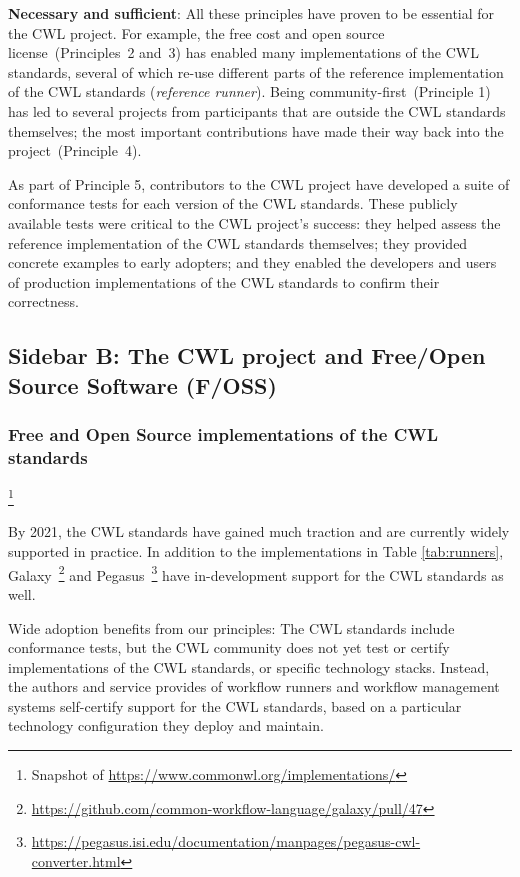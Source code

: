 {\textbf{Necessary and sufficient}: All these principles have proven to be essential for the CWL project. For example, the free cost and open source license~(Principles~2 and~3) has enabled many implementations of the CWL standards, several of which re-use different parts of the reference implementation of the CWL standards (\textit{reference runner}). Being community-first~(Principle 1) has led to several projects from participants that are outside the CWL standards themselves; the most important contributions have made their way back into the project~(Principle~4).

As part of Principle 5, contributors to the CWL project have developed a suite of conformance tests for each version of the CWL standards. These publicly available tests were critical to the CWL project's success: they helped assess the reference implementation of the CWL standards themselves; they provided concrete examples to early adopters; and they enabled the developers and users of production implementations of the CWL standards to confirm their correctness.

\subsection{Sidebar B: The CWL project and Free/Open Source Software (F/OSS)}\label{sec:sidebar:b}

\subsubsection{Free and Open Source implementations of the CWL standards}\footnote{Snapshot of \url{https://www.commonwl.org/implementations/}}

By 2021, the CWL standards have gained much traction and are currently widely supported in practice. In addition to the implementations in Table \ref{tab:runners}, Galaxy~\cite{afgan_galaxy_2018}\footnote{\url{https://github.com/common-workflow-language/galaxy/pull/47}} and Pegasus~\cite{deelman_pegasus_2015}\footnote{\url{https://pegasus.isi.edu/documentation/manpages/pegasus-cwl-converter.html}} have in-development support for the CWL standards as well.

Wide adoption benefits from our principles: The CWL standards include conformance tests, but the CWL community does not yet test or certify implementations of the CWL standards, or specific technology stacks. Instead, the authors and service provides of workflow runners and workflow management systems self-certify support for the CWL standards, based on a particular technology configuration they deploy and maintain.

}
